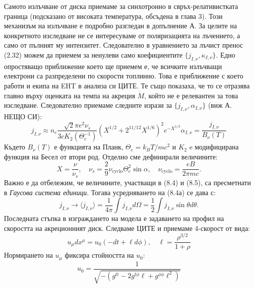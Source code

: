 Самото излъчване от диска приемаме за синхотронно в свръх-релативистката граница (подсказано от високата температура, обсъдена в глава 3). Този механизъм на излъчване е подробно разгледан в допълнение А. За целите на конкретното изследване не се интересуваме от поляризацията на лъчението, а само от пълният му интензитет. Следователно в уравнението за лъчист пренос (2.32) можем да приемем за ненулеви само коефициентите $\{j_{I,\nu}, \kappa_{I,\nu}\}.$ Едно опростяващо приближение което ще приемем е, че всичките излъчващи електрони са разпределени по скорости топлинно. Това е приближение с което работи и екипа на EHT в анализа си ЦИТЕ. Те също показаха, че то се отразява главно върху оценката на темпа на акреция $\dot{M}$, който не е релевантен за това изследване. Следователно приемаме следните изрази за $\{j_{I,\nu}, \alpha_{I,\nu}\}$ (виж А. НЕЩО СИ):
\begin{subequations}
	\begin{equation}
		j_{I,\nu}\approx n_e \frac{\sqrt{2}\pi e^2\nu_s}{3cK_2(\Theta_e^{-1})}\left(X^{1/2} + 2^{11/12}X^{1/6}\right)^2 e^{-X^{1/3}}
	\end{equation}
	\begin{equation}
		\alpha_{I,\nu} = \frac{j_{I,\nu}}{B_\nu(T)}
	\end{equation}
\end{subequations}
Където $B_\nu(T)$ е функцията на Планк, $\Theta_e = k_BT/mc^2$ и $K_2$ e модифицирана функция на Бесел от втори род. Отделно сме дефинирали величините:
\begin{equation}
	X = \frac{\nu}{\nu_s},\quad \nu_s = \frac{2}{9}\nu_\text{cyclo}\Theta_e^2\sin\alpha, \quad \nu_\text{cyclo} = \frac{eB}{2\pi m c}.
\end{equation}
Важно е да отбележим, че величините, участващи в (8.4) и (8.5), са пресметнати в \emph{Гаусова система единици}. Тогава усредняването на (8.4а) се дава с:
\begin{equation}
	j_{I,\nu}\rightarrow\langle j_{I,\nu} \rangle = \frac{1}{4\pi}\int j_{I,\nu} d\Omega = \frac{1}{2}\int j_{I,\nu} \sin\theta d\theta.
\end{equation}
Последната стъпка в изграждането на модела е задаването на профил на скоростта на акреционният диск. Следваме ЦИТЕ и приемаме 4-скорост от вида:
\begin{equation}
	u_\mu dx^\mu = u_0(-dt + \ell d\phi),\quad \ell = \frac{\rho^{3/2}}{1 +\rho}
\end{equation}
Нормирането на $u_\mu$ фиксира стойността на $u_0$:
\begin{equation}
	u_0 = \frac{1}{\sqrt{-(g^{tt} - 2g^{t\phi}\ell + g^{\phi\phi}\ell^2)}}
\end{equation}
